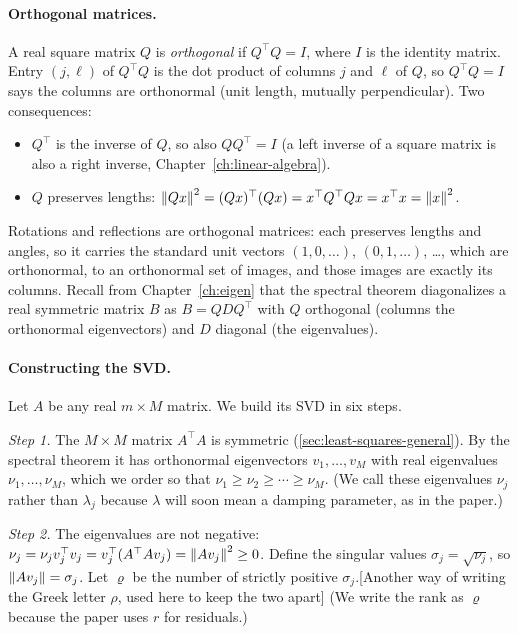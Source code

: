 \paragraph{Orthogonal matrices.} A real square matrix $Q$ is \emph{orthogonal} if $Q^\top Q = I$, where $I$ is the identity matrix. Entry $(j,\ell)$ of $Q^\top Q$ is the dot product of columns $j$ and $\ell$ of $Q$, so $Q^\top Q = I$ says the columns are orthonormal (unit length, mutually perpendicular). Two consequences:
\begin{itemize}
\item $Q^\top$ is the inverse of $Q$, so also $QQ^\top = I$ (a left inverse of a square matrix is also a right inverse, Chapter~\ref{ch:linear-algebra}).
\item $Q$ preserves lengths: $\left\lVert Qx\right\rVert^2 = (Qx)^\top(Qx) = x^\top Q^\top Q x = x^\top x = \left\lVert x\right\rVert^2$.
\end{itemize}
Rotations and reflections are orthogonal matrices: each preserves lengths and angles, so it carries the standard unit vectors $(1,0,\dots)$, $(0,1,\dots)$, \dots, which are orthonormal, to an orthonormal set of images, and those images are exactly its columns. Recall from Chapter~\ref{ch:eigen} that the spectral theorem diagonalizes a real symmetric matrix $B$ as $B = Q D Q^\top$ with $Q$ orthogonal (columns the orthonormal eigenvectors) and $D$ diagonal (the eigenvalues).

\paragraph{Constructing the SVD.} Let $A$ be any real $m\times M$ matrix. We build its SVD in six steps.

\emph{Step 1.} The $M\times M$ matrix $A^\top A$ is symmetric (\cref{sec:least-squares-general}). By the spectral theorem it has orthonormal eigenvectors $v_1,\dots,v_M$ with real eigenvalues $\nu_1,\dots,\nu_M$, which we order so that $\nu_1\ge\nu_2\ge\cdots\ge\nu_M$. (We call these eigenvalues $\nu_j$ rather than $\lambda_j$ because $\lambda$ will soon mean a damping parameter, as in the paper.)

\emph{Step 2.} The eigenvalues are not negative: $\nu_j = \nu_j v_j^\top v_j = v_j^\top (A^\top A v_j) = \left\lVert Av_j\right\rVert^2 \ge 0$. Define the singular values $\sigma_j = \sqrt{\nu_j}$, so $\left\lVert Av_j\right\rVert = \sigma_j$. Let $\varrho$ be the number of strictly positive $\sigma_j$.[Another way of writing the Greek letter $\rho$, used here to keep the two apart] (We write the rank as $\varrho$ because the paper uses $r$ for residuals.)

